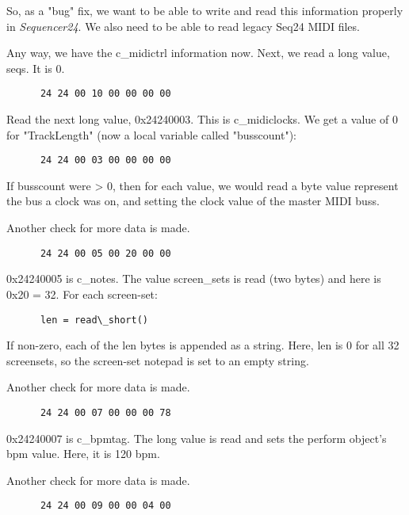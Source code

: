    So, as a "bug" fix, we want to be able to write and read
   this information properly in \textsl{Sequencer24}.
   We also need to be able to read legacy Seq24 MIDI files.

   Any way, we have the c\_midictrl information now.  Next, we read a long
   value, seqs.  It is 0.

   \begin{verbatim}
      24 24 00 10 00 00 00 00
   \end{verbatim}

   Read the next long value, 0x24240003.  This is c\_midiclocks.  We get a
   value of 0 for "TrackLength" (now a local variable called "busscount"):

   \begin{verbatim}
      24 24 00 03 00 00 00 00
   \end{verbatim}

   If busscount were > 0, then for each value, we would read a byte value
   represent the bus a clock was on, and setting the clock value of the
   master MIDI buss.

   Another check for more data is made.

   \begin{verbatim}
      24 24 00 05 00 20 00 00
   \end{verbatim}

   0x24240005 is c\_notes.  The value screen\_sets is read (two bytes) and
   here is 0x20 = 32.  For each screen-set:

   \begin{verbatim}
      len = read\_short()
   \end{verbatim}

   If non-zero, each of the len bytes is appended as a string.  Here, len is 
   0 for all 32 screensets, so the screen-set notepad is set to an empty
   string.

   Another check for more data is made.

   \begin{verbatim}
      24 24 00 07 00 00 00 78
   \end{verbatim}

   0x24240007 is c\_bpmtag.  The long value is read and sets the perform
   object's bpm value.  Here, it is 120 bpm.

   Another check for more data is made.

   \begin{verbatim}
      24 24 00 09 00 00 04 00
   \end{verbatim}

